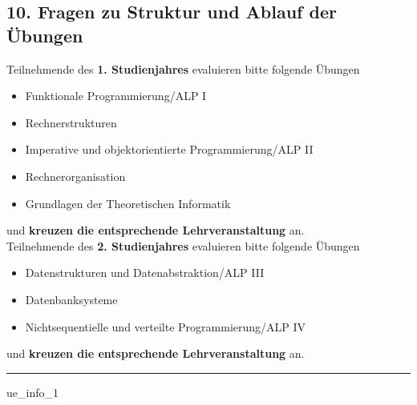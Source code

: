 \documentclass[a4paper,10pt]{article}
\makeatletter
\def\saveenum{\xdef\@savedenum{\the\c@enumi\relax}}
\makeatother
\begin{document}
{\begin{enumerate}
\end{enumerate} \saveenum

\vspace{-1cm}


\pagebreak




\subsection*{10. Fragen zu Struktur und Ablauf der Übungen}

Teilnehmende des \textbf{1. Studienjahres} evaluieren bitte folgende Übungen
\begin{itemize}
	\item Funktionale Programmierung/ALP I
	\item Rechnerstrukturen
	\item Imperative und objektorientierte Programmierung/ALP II
	\item Rechnerorganisation
	\item Grundlagen der Theoretischen Informatik
\end{itemize}
und \textbf{kreuzen die entsprechende Lehrveranstaltung} an. \\

Teilnehmende des \textbf{2. Studienjahres} evaluieren bitte folgende Übungen
\begin{itemize}
	\item Datenstrukturen und Datenabstraktion/ALP III
	\item Datenbanksysteme
	\item Nichtsequentielle und verteilte Programmierung/ALP IV
\end{itemize}
und \textbf{kreuzen die entsprechende Lehrveranstaltung} an.

\vspace{.5cm}
\noindent\rule{\textwidth}{1pt}
\vspace{0.5cm}

\begin{questionmult}{ue_info_1}
	\begin{choices}
	\end{choices}
\end{questionmult}


}
\end{document}
